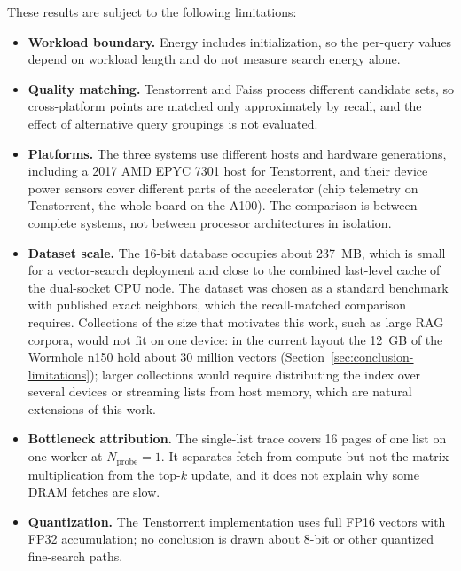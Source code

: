 These results are subject to the following limitations:
\begin{itemize}
    \item \textbf{Workload boundary.} Energy includes initialization, so the
    per-query values depend on workload length and do not measure search
    energy alone.
    \item \textbf{Quality matching.} Tenstorrent and Faiss process different
    candidate sets, so cross-platform points are matched only approximately
    by recall, and the effect of alternative query groupings is not
    evaluated.
    \item \textbf{Platforms.} The three systems use different hosts and
    hardware generations, including a 2017 AMD EPYC 7301 host for
    Tenstorrent, and their device power sensors cover different parts of the
    accelerator (chip telemetry on Tenstorrent, the whole board on the A100).
    The comparison is between complete systems, not between processor
    architectures in isolation.
    \item \textbf{Dataset scale.} The 16-bit database occupies about 237~MB,
    which is small for a vector-search deployment and close to the combined
    last-level cache of the dual-socket CPU node. The dataset was chosen as a
    standard benchmark with published exact neighbors, which the
    recall-matched comparison requires. Collections of the size that
    motivates this work, such as large RAG corpora, would not fit on one
    device: in the current layout the 12~GB of the Wormhole n150 hold about
    30 million vectors (Section~\ref{sec:conclusion-limitations}); larger
    collections would require distributing the index over several devices or
    streaming lists from host memory, which are natural extensions of this
    work.
    \item \textbf{Bottleneck attribution.} The single-list trace covers 16
    pages of one list on one worker at \(N_{\mathrm{probe}}=1\). It separates fetch from compute
    but not the matrix multiplication from the top-\(k\) update, and it does
    not explain why some DRAM fetches are slow.
    \item \textbf{Quantization.} The Tenstorrent implementation uses full
    FP16 vectors with FP32 accumulation; no conclusion is drawn about 8-bit or
    other quantized fine-search paths.
\end{itemize}

\cleardoublepage
